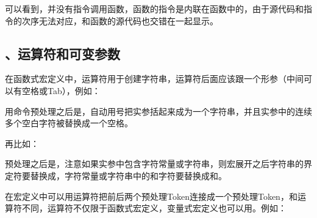 

可以看到，并没有指令调用函数，函数的指令是内联在函数中的，由于源代码和指令的次序无法对应，和函数的源代码也交错在一起显示。


\subsection{\BookCode{\#}、\BookCode{\#\#}运算符和可变参数}
%


在函数式宏定义中，\BookCode{\#}运算符用于创建字符串，\BookCode{\#}运算符后面应该跟一个形参（中间可以有空格或Tab），例如：




用命令预处理之后是，自动用\BookCode{\BookQuoteChar{}}号把实参括起来成为一个字符串，并且实参中的连续多个空白字符被替换成一个空格。



再比如：




预处理之后是，注意如果实参中包含字符常量或字符串，则宏展开之后字符串的界定符\BookCode{\BookQuoteChar{}}要替换成\BookCode{\textbackslash{}\BookQuoteChar{}}，字符常量或字符串中的\BookCode{\textbackslash{}}和\BookCode{\BookQuoteChar{}}字符要替换成\BookCode{\textbackslash{}\textbackslash{}}和\BookCode{\textbackslash{}\BookQuoteChar{}}。



在宏定义中可以用\BookCode{\#\#}运算符把前后两个预处理Token连接成一个预处理Token，和\BookCode{\#}运算符不同，\BookCode{\#\#}运算符不仅限于函数式宏定义，变量式宏定义也可以用。例如：




